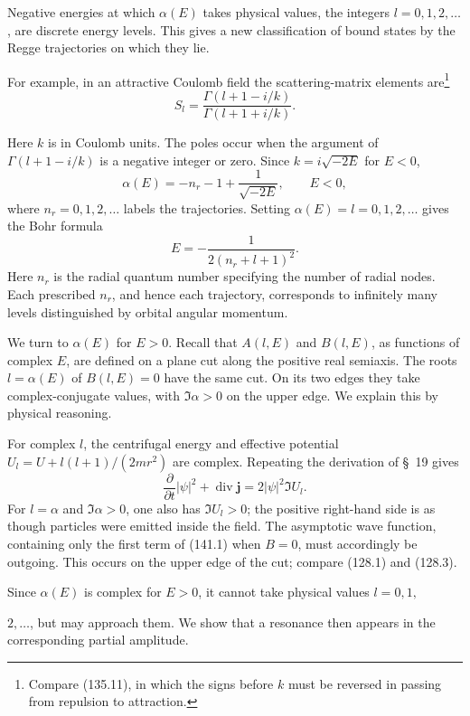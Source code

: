 Negative energies at which $\alpha(E)$ takes physical values, the integers $l=0,1,2,\ldots$, are discrete energy levels. This gives a new classification of bound states by the Regge trajectories on which they lie.

For example, in an attractive Coulomb field the scattering-matrix elements are\footnote{Compare (135.11), in which the signs before $k$ must be reversed in passing from repulsion to attraction.}
\begin{equation}
 S_l=\frac{\Gamma(l+1-i/k)}{\Gamma(l+1+i/k)}.
 \tag{141.10}
\end{equation}

Here $k$ is in Coulomb units. The poles occur when the argument of $\Gamma(l+1-i/k)$ is a negative integer or zero. Since $k=i\sqrt{-2E}$ for $E<0$,
\begin{equation}
 \alpha(E)=-n_r-1+\frac1{\sqrt{-2E}},\qquad E<0,
 \tag{141.11}
\end{equation}
where $n_r=0,1,2,\ldots$ labels the trajectories. Setting $\alpha(E)=l=0,1,2,\ldots$ gives the Bohr formula
\[
 E=-\frac1{2(n_r+l+1)^2}.
\]
Here $n_r$ is the radial quantum number specifying the number of radial nodes. Each prescribed $n_r$, and hence each trajectory, corresponds to infinitely many levels distinguished by orbital angular momentum.

We turn to $\alpha(E)$ for $E>0$. Recall that $A(l,E)$ and $B(l,E)$, as functions of complex $E$, are defined on a plane cut along the positive real semiaxis. The roots $l=\alpha(E)$ of $B(l,E)=0$ have the same cut. On its two edges they take complex-conjugate values, with $\Im\alpha>0$ on the upper edge. We explain this by physical reasoning.

For complex $l$, the centrifugal energy and effective potential $U_l=U+l(l+1)/(2mr^2)$ are complex. Repeating the derivation of \S~19 gives
\[
 \frac{\partial}{\partial t}|\psi|^2+\operatorname{div}\mathbf j=2|\psi|^2\Im U_l.
\]
For $l=\alpha$ and $\Im\alpha>0$, one also has $\Im U_l>0$; the positive right-hand side is as though particles were emitted inside the field. The asymptotic wave function, containing only the first term of (141.1) when $B=0$, must accordingly be outgoing. This occurs on the upper edge of the cut; compare (128.1) and (128.3).

Since $\alpha(E)$ is complex for $E>0$, it cannot take physical values $l=0,1,$

$2,\ldots$, but may approach them. We show that a resonance then appears in the corresponding partial amplitude.

